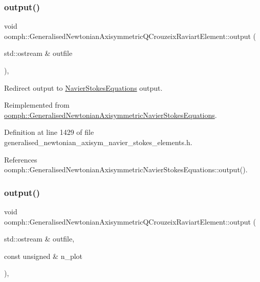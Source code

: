 \subsubsection{\texorpdfstring{output()}{output()}\hspace{0.1cm}{\footnotesize\ttfamily [1/4]}}
{\footnotesize\ttfamily void oomph\+::\+Generalised\+Newtonian\+Axisymmetric\+Q\+Crouzeix\+Raviart\+Element\+::output (\begin{DoxyParamCaption}\item[{std\+::ostream \&}]{outfile }\end{DoxyParamCaption})\hspace{0.3cm}{\ttfamily [inline]}, {\ttfamily [virtual]}}



Redirect output to \hyperlink{classoomph_1_1NavierStokesEquations}{Navier\+Stokes\+Equations} output. 



Reimplemented from \hyperlink{classoomph_1_1GeneralisedNewtonianAxisymmetricNavierStokesEquations_a25e906f89c3cec75081bd2fc88b37fd5}{oomph\+::\+Generalised\+Newtonian\+Axisymmetric\+Navier\+Stokes\+Equations}.



Definition at line 1429 of file generalised\+\_\+newtonian\+\_\+axisym\+\_\+navier\+\_\+stokes\+\_\+elements.\+h.



References oomph\+::\+Generalised\+Newtonian\+Axisymmetric\+Navier\+Stokes\+Equations\+::output().

\mbox{\label{classoomph_1_1GeneralisedNewtonianAxisymmetricQCrouzeixRaviartElement_a9bf8fddef7384ba0a8966502a137584b}} 
\subsubsection{\texorpdfstring{output()}{output()}\hspace{0.1cm}{\footnotesize\ttfamily [2/4]}}
{\footnotesize\ttfamily void oomph\+::\+Generalised\+Newtonian\+Axisymmetric\+Q\+Crouzeix\+Raviart\+Element\+::output (\begin{DoxyParamCaption}\item[{std\+::ostream \&}]{outfile,  }\item[{const unsigned \&}]{n\+\_\+plot }\end{DoxyParamCaption})\hspace{0.3cm}{\ttfamily [inline]}, {\ttfamily [virtual]}}



